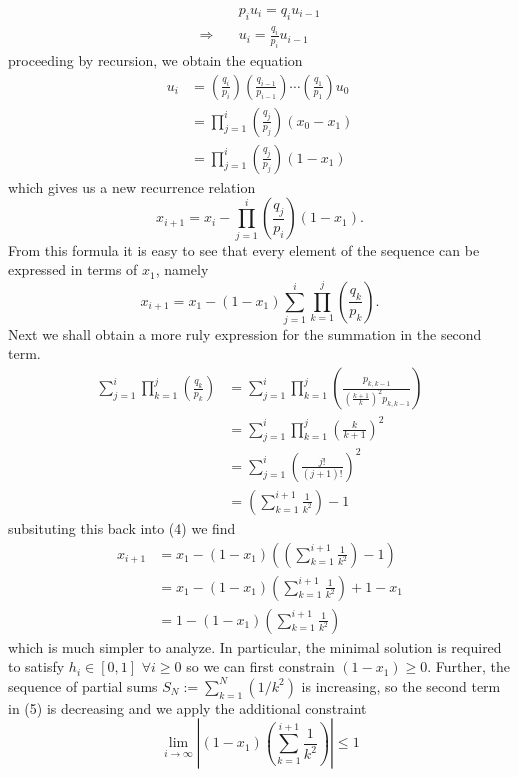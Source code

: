 \documentclass[11pt, letterpaper]{article}
\begin{document}
    \begin{align*}
        &p_iu_i=q_iu_{i-1}\\
        \Rightarrow\quad&u_i=\frac{q_i}{p_i}u_{i-1}
    \end{align*}
    proceeding by recursion, we obtain the equation
    \begin{align*}
        u_i&=\left(\frac{q_i}{p_i}\right)\left(\frac{q_{i-1}}{p_{i-1}}\right)\cdots\left(\frac{q_1}{p_1}\right)u_0\\
        &=\prod_{j=1}^i\left(\frac{q_j}{p_j}\right)(x_0-x_1)\\
        &=\prod_{j=1}^i\left(\frac{q_j}{p_j}\right)(1-x_1)
    \end{align*}
    which gives us a new recurrence relation
    \[x_{i+1}=x_i-\prod_{j=1}^i\left(\frac{q_j}{p_i}\right)(1-x_1).\]
    From this formula it is easy to see that every element of the sequence can be expressed in terms of $x_1$, namely
    \[x_{i+1}=x_1-(1-x_1)\sum_{j=1}^i\prod_{k=1}^j\left(\frac{q_k}{p_k}\right).\tag{4}\]
    Next we shall obtain a more ruly expression for the summation in the second term.
    \begin{align*}
        \sum_{j=1}^i\prod_{k=1}^j\left(\frac{q_k}{p_k}\right)&=\sum_{j=1}^i\prod_{k=1}^j\left(\frac{p_{k,k-1}}{\left(\frac{k+1}{k}\right)^2p_{k,k-1}}\right)\\
        &=\sum_{j=1}^i\prod_{k=1}^j\left(\frac{k}{k+1}\right)^2\\
        &=\sum_{j=1}^i\left(\frac{j!}{(j+1)!}\right)^2\\
        &=\left(\sum_{k=1}^{i+1}\frac{1}{k^2}\right)-1\tag{simplify factorials and reindex}
    \end{align*}
    subsituting this back into (4) we find
    \begin{align*}
        x_{i+1}&=x_1-(1-x_1)\left(\left(\sum_{k=1}^{i+1}\frac{1}{k^2}\right)-1\right)\\
        &=x_1-(1-x_1)\left(\sum_{k=1}^{i+1}\frac{1}{k^2}\right)+1-x_1\\
        &=1-(1-x_1)\left(\sum_{k=1}^{i+1}\frac{1}{k^2}\right)\tag{5}
    \end{align*}
    which is much simpler to analyze. In particular, the minimal solution is required to satisfy $h_i\in[0,1]$ $\forall i\geq 0$
    so we can first constrain $(1-x_1)\geq 0$. Further, the sequence of partial sums $S_N:=\sum_{k=1}^N(1/k^2)$ is increasing, so the second term in (5) is decreasing
    and we apply the additional constraint
    \[\lim_{i\rightarrow\infty}\left|(1-x_1)\left(\sum_{k=1}^{i+1}\frac{1}{k^2}\right)\right|\leq 1\]
\end{document}
